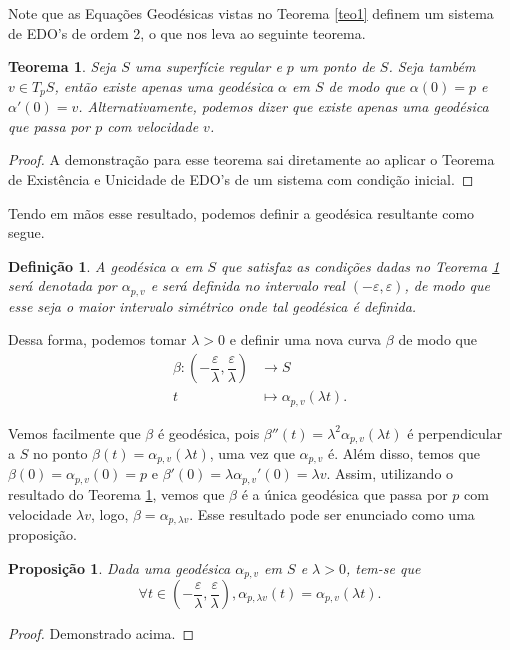 \documentclass{article}
\newtheorem{theorem}{Teorema}
\newtheorem{definition}{Definição}
\newtheorem{proposition}{Proposição}
\begin{document}
Note que as Equações Geodésicas vistas no Teorema \ref{teo1} definem um sistema de EDO's de ordem 2, o que nos leva ao seguinte teorema.
\begin{theorem}
    \label{teo2}
    Seja $S$ uma superfície regular e $p$ um ponto de $S$. Seja também $v\in T_pS$, então existe apenas uma geodésica $\alpha$ em $S$ de modo que $\alpha(0) = p$ e $\alpha'(0) = v$. Alternativamente, podemos dizer que existe apenas uma geodésica que passa por $p$ com velocidade $v$.
\end{theorem}
\begin{proof}
    A demonstração para esse teorema sai diretamente ao aplicar o Teorema de Existência e Unicidade de EDO's de um sistema com condição inicial.
\end{proof}

Tendo em mãos esse resultado, podemos definir a geodésica resultante como segue.
\begin{definition}
    \label{def5}
    A geodésica $\alpha$ em $S$ que satisfaz as condições dadas no Teorema \ref{teo2} será denotada por $\alpha_{p, v}$ e será definida no intervalo real $(-\varepsilon, \varepsilon)$, de modo que esse seja o maior intervalo simétrico onde tal geodésica é definida.
\end{definition}

Dessa forma, podemos tomar $\lambda > 0$ e definir uma nova curva $\beta$ de modo que
\begin{align*}
    \beta : \left(-\dfrac{\varepsilon}{\lambda}, \dfrac{\varepsilon}{\lambda}\right) & \to S \\
    t & \mapsto \alpha_{p, v}(\lambda t).
\end{align*}

Vemos facilmente que $\beta$ é geodésica, pois $\beta''(t) = \lambda^2\alpha_{p, v}(\lambda t)$ é perpendicular a $S$ no ponto $\beta(t) = \alpha_{p, v}(\lambda t)$, uma vez que $\alpha_{p, v}$ é. Além disso, temos que $\beta(0) = \alpha_{p, v}(0) = p$ e $\beta'(0) = \lambda\alpha_{p, v}'(0) = \lambda v$. Assim, utilizando o resultado do Teorema \ref{teo2}, vemos que $\beta$ é a única geodésica que passa por $p$ com velocidade $\lambda v$, logo, $\beta = \alpha_{p, \lambda v}$. Esse resultado pode ser enunciado como uma proposição.
\begin{proposition}
    \label{prop3}
    Dada uma geodésica $\alpha_{p, v}$ em $S$ e $\lambda > 0$, tem-se que
    \[\forall t\in \left(-\dfrac{\varepsilon}{\lambda}, \dfrac{\varepsilon}{\lambda}\right), \alpha_{p, \lambda v}(t) = \alpha_{p, v}(\lambda t).\]
\end{proposition}
\begin{proof}
    Demonstrado acima.
\end{proof}
\end{document}
